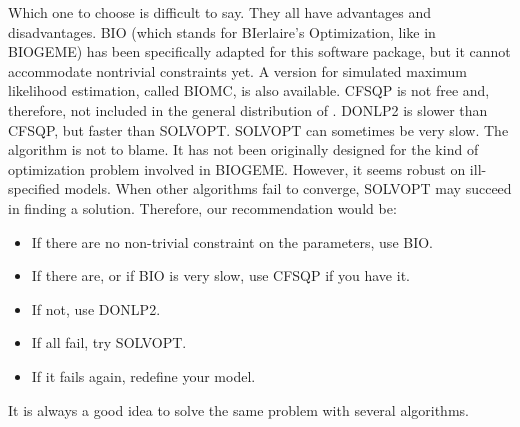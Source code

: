 \documentclass[12pt]{memoir}
\begin{document}
   Which one to choose is difficult to say. They all have advantages and
   disadvantages. BIO (which stands for BIerlaire's Optimization, like in
   BIOGEME) has been specifically adapted for this software
   package, but it cannot accommodate nontrivial constraints yet. A version for simulated maximum likelihood estimation, called BIOMC, is also available. CFSQP is not free and, therefore, not included in the general
   distribution of \BIOGEME. DONLP2 is slower than CFSQP, but faster
   than SOLVOPT.  SOLVOPT can sometimes be very slow. The algorithm is
   not to blame. It has not been originally designed for the kind of
   optimization problem involved in BIOGEME. However, it seems robust on
   ill-specified models. When other algorithms fail to converge, SOLVOPT
   may succeed in finding a solution.  Therefore, our recommendation would be:
   \begin{itemize}
      \item If there are no non-trivial constraint on the parameters, use BIO.
      \item If there are, or if BIO is very slow, use CFSQP if you have it.
      \item If not, use DONLP2.
      \item If all fail, try SOLVOPT.
      \item If it fails again, redefine your model. 
   \end{itemize}
   It is always a good idea to solve the same problem with several
   algorithms.
\end{document}
